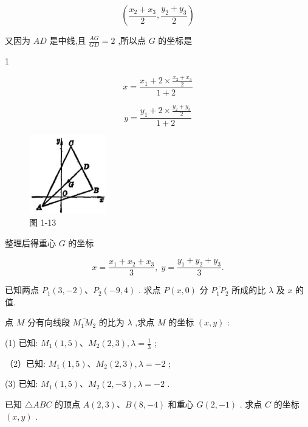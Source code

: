 \documentclass[lang=cn,newtx,10pt,scheme=chinese]{elegantbook}
\begin{document}
\[
  \left( {\frac{{x}_{2} + {x}_{3}}{2},\frac{{y}_{2} + {y}_{3}}{2}}\right)
\]

又因为 \({AD}\) 是中线,且 \(\frac{AG}{GD} = 2\) ,所以点 \(G\) 的坐标是

1

\[
  x = \frac{{x}_{1} + 2 \times \frac{{x}_{2} + {x}_{3}}{2}}{1 + 2}
\]

\[
  y = \frac{{y}_{1} + 2 \times \frac{{y}_{2} + {y}_{3}}{2}}{1 + 2}
\]

\begin{figure}[h]
  \centering
  \includegraphics[max width=0.3\textwidth]{images/01912cc2-ffb6-728e-9ae7-b113ff05c64b_15_210180.jpg}
  \caption{图 1-13}
\end{figure}



整理后得重心 \(G\) 的坐标

\[
  x = \frac{{x}_{1} + {x}_{2} + {x}_{3}}{3},\;y = \frac{{y}_{1} + {y}_{2} + {y}_{3}}{3}.
\]

\begin{problemset}[练习]

\item 已知两点 \({P}_{1}\left( {3, - 2}\right) \text{、}{P}_{2}\left( {-9,4}\right)\) . 求点 \(P\left( {x,0}\right)\) 分 \(\overline{{P}_{1}{P}_{2}}\) 所成的比 \(\lambda\) 及 \(x\) 的值.

\item 点 \(M\) 分有向线段 \(\overline{{M}_{1}{M}_{2}}\) 的比为 \(\lambda\) ,求点 \(M\) 的坐标 \(\left( {x,y}\right)\) :

(1) 已知: \({M}_{1}\left( {1,5}\right) \text{、}{M}_{2}\left( {2,3}\right) ,\lambda = \frac{1}{3}\) ;

（2）已知: \({M}_{1}\left( {1,5}\right) \text{、}{M}_{2}\left( {2,3}\right) ,\lambda = - 2\) ;

(3) 已知: \({M}_{1}\left( {1,5}\right) \text{、}{M}_{2}\left( {2, - 3}\right) ,\lambda = - 2\) .

\item 已知 \(\bigtriangleup {ABC}\) 的顶点 \(A\left( {2,3}\right) \text{、}B\left( {8, - 4}\right)\) 和重心 \(G\left( {2, - 1}\right)\) . 求点 \(C\) 的坐标 \(\left( {x,y}\right)\) .

\end{problemset}
\end{document}

